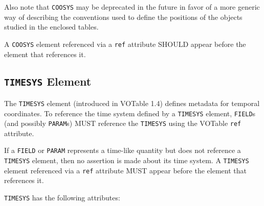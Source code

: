 \documentclass[11pt,a4paper]{ivoa}
\let\fg=\color
\def\attr#1{{\tt{\fg{DarkRed}#1}}}
\def\elem#1{{\tt{\fg{DarkRed}#1}}}
\begin{document}
Also note that \elem{COOSYS} may be deprecated in the
future in favor of a more generic way of describing the conventions used
to define the positions of the objects studied in the enclosed tables.

A \elem{COOSYS} element referenced via a \attr{ref} attribute
SHOULD appear before the element that references it.

\subsection{\elem{TIMESYS} Element}
\label{elem:TIMESYS}

The \elem{TIMESYS} element (introduced in VOTable 1.4) defines metadata
for temporal coordinates.  To reference the time system defined by a
\elem{TIMESYS} element,  \elem{FIELD}s (and possibly \elem{PARAM}s)
MUST reference the \elem{TIMESYS} using the VOTable \attr{ref} attribute.

If a \elem{FIELD} or \elem{PARAM} represents a time-like quantity but does not
reference a \elem{TIMESYS} element, then no assertion is made about its time
system. A \elem{TIMESYS} element referenced via a \attr{ref} attribute MUST appear
before the element that references it.

\elem{TIMESYS} has the following attributes:
\end{document}
